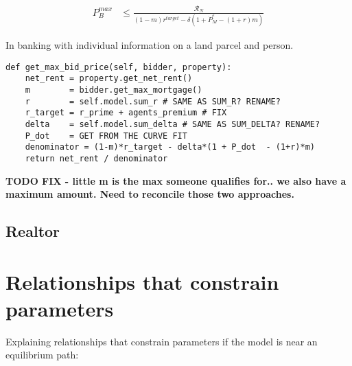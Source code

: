 \begin{eqnarray}
P_B^{max} & \le    \frac{\mathcal{R}_N}{(1-m)r^{target}-\delta \left(1 + \dot P_M^e - (1+r)m\right)} \label{eqn-bid-price} \end{eqnarray}

In banking with individual information on a land parcel and person.
\begin{lstlisting}
def get_max_bid_price(self, bidder, property):
    net_rent = property.get_net_rent()
    m        = bidder.get_max_mortgage()
    r        = self.model.sum_r # SAME AS SUM_R? RENAME?
    r_target = r_prime + agents_premium # FIX
    delta    = self.model.sum_delta # SAME AS SUM_DELTA? RENAME?
    P_dot    = GET FROM THE CURVE FIT
    denominator = (1-m)*r_target - delta*(1 + P_dot  - (1+r)*m)
    return net_rent / denominator   
\end{lstlisting}

\textbf{TODO FIX - little m is the max someone qualifies for.. we also have a maximum amount. Need to reconcile those two approaches.}
 


\subsection{Realtor}


\newpage

\section{Relationships that constrain parameters }

Explaining relationships that constrain parameters if the model is near an equilibrium path: 

